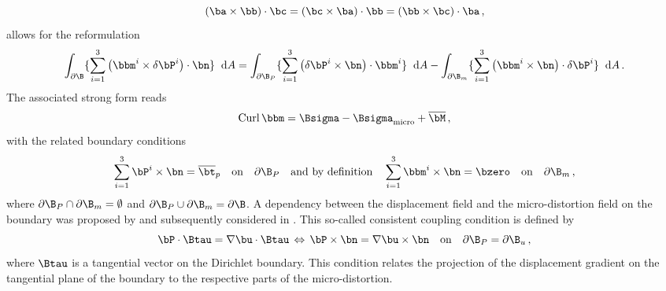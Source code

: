 \begin{equation}
(\ba \times \bb) \cdot \bc = (\bc \times \ba) \cdot \bb  = (\bb \times \bc) \cdot \ba \,,
\end{equation}
allows for the reformulation
\begin{equation}
 \int_{ \partial \B}  \{ \sum_{i=1}^3  \left( \bbm^i  \times \delta {\Bdis}^i  \right) \cdot \bn  \}  \;\; \textrm{d}A =
 \int_{ \partial \B_P}  \{ \sum_{i=1}^3  \left(   \delta {\Bdis}^i  \times \bn  \right) \cdot \bbm^i  \}  \;\; \textrm{d}A   -  \int_{ \partial \B_m}  \{ \sum_{i=1}^3  \left(  \bbm^i  \times \bn  \right) \cdot \delta {\Bdis}^i   \}  \;\; \textrm{d}A  \,.
\end{equation}
The associated strong form reads  
 \begin{equation}
   \label{eq:sf2}
 \Curl \bbm = \Bsigma - \Bsigma_\textrm{micro} + \overline\bM \,,
 \end{equation}
 with the related boundary conditions  
 \begin{equation}
\sum_{i=1}^3  {\Bdis}^i  \times \bn  = \overline{\bt}_p \quad \textrm{on} \quad \partial \B_\dis \quad \textrm{and by definition} \quad \sum_{i=1}^3    \bbm^i  \times \bn = \bzero \quad \textrm{on} \quad  \partial \B_m\,, 
 \end{equation}
 where $\partial \B_\dis \cap \partial \B_m = \emptyset $ and $\partial  \B_\dis \cup \partial \B_m= \partial \B $.  
A dependency between the displacement field and the micro-distortion field on the boundary was proposed by \cite{NefEidMad:2019:ios} and subsequently considered in \cite{SkyNeuMueSchNef:2021:CM,RizHueMadNef:2021:aso3,RizHueMadNef:2021:aso4,DagRizKhaLewMadNef:2021:tcc}. This so-called consistent coupling condition is defined by
 \begin{equation}
  \Bdis \cdot \Btau = \nabla \bu \cdot \Btau \, \Leftrightarrow \,  \Bdis \times \bn = \nabla \bu \times \bn  \quad \textrm{on}\quad  \partial \B_\dis = \partial \B_u  \,,
 \end{equation}
where $\Btau$ is a tangential vector on the Dirichlet boundary.  This condition relates the projection of the displacement gradient on the tangential plane of the boundary to the respective parts of the micro-distortion.
 

